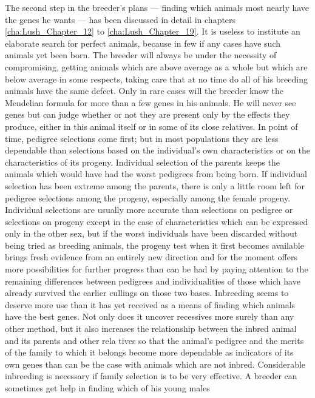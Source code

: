 The second step in the breeder's plans --- finding which animals most
nearly have the genes he wants --- has been discussed in detail in chapters
\ref{cha:Lush_Chapter_12} to \ref{cha:Lush_Chapter_19}. It is useless to
institute an elaborate search for perfect animals,
because in few if any cases have such animals yet been born. The breeder
will always be under the necessity of compromising, getting animals
which are above average as a whole but which are below average in
some respects, taking care that at no time do all of his breeding animals
have the same defect. Only in rare cases will the breeder know the
Mendelian formula for more than a few genes in his animals. He
will never see genes but can judge whether or not they are present only
by the effects they produce, either in this animal itself or in some of its
close relatives. In point of time, pedigree selections come first; but in
most populations they are less dependable than selections based on the
individual's own characteristics or on the characteristics of its progeny.
Individual selection of the parents keeps the animals which would have
had the worst pedigrees from being born. If individual selection has
been extreme among the parents, there is only a little room left for
pedigree selections among the progeny, especially among the female
progeny. Individual selections are usually more accurate than selections
on pedigree or selections on progeny except in the case of characteristics
which can be expressed only in the other sex, but if the worst individuals
have been discarded without being tried as breeding animals,
the progeny test when it first becomes available brings fresh evidence
from an entirely new direction and for the moment offers more possibilities
for further progress than can be had by paying attention to the
remaining differences between pedigrees and individualities of those
which have already survived the earlier cullings on those two bases.
Inbreeding seems to deserve more use than it has yet received as a means
of finding which animals have the best genes. Not only does it uncover
recessives more surely than any other method, but it also increases the
relationship between the inbred animal and its parents and other rela tives
so that the animal's pedigree and the merits of the family to which
it belongs become more dependable as indicators of its own genes than
can be the case with animals which are not inbred. Considerable
inbreeding is necessary if family selection is to be very effective. A
breeder can sometimes get help in finding which of his young males
